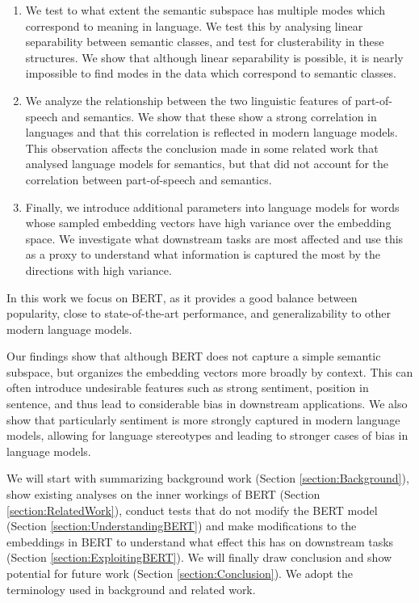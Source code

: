 \documentclass[a4paper,12pt,oneside,openright]{report}
\begin{document}
\begin{enumerate}
\item We test to what extent the semantic subspace has multiple modes which correspond to meaning in language.
We test this by analysing linear separability between semantic classes, and test for clusterability in these structures.
We show that although linear separability is possible, it is nearly impossible to find modes in the data which correspond to semantic classes.
\item We analyze the relationship between the two linguistic features of part-of-speech and semantics. 
We show that these show a strong correlation in languages and that this correlation is reflected in modern language models.
This observation affects the conclusion made in some related work that analysed language models for semantics, but that did not account for the correlation between part-of-speech and semantics.
\item Finally, we introduce additional parameters into language models for words whose sampled embedding vectors have high variance over the embedding space.
We investigate what downstream tasks are most affected and use this as a proxy to understand what information is captured the most by the directions with high variance.
\end{enumerate} 

In this work we focus on BERT, as it provides a good balance between popularity, close to state-of-the-art performance, and generalizability to other modern language models.

Our findings show that although BERT does not capture a simple semantic subspace, but organizes the embedding vectors more broadly by context.
This can often introduce undesirable features such as strong sentiment, position in sentence, and thus lead to considerable bias in downstream applications.
We also show that particularly sentiment is more strongly captured in modern language models, allowing for language stereotypes and leading to stronger cases of bias in language models.

We will start with summarizing background work (Section \ref{section:Background}), show existing analyses on the inner workings of BERT (Section \ref{section:RelatedWork}), conduct tests that do not modify the BERT model (Section \ref{section:UnderstandingBERT}) and make modifications to the embeddings in BERT to understand what effect this has on downstream tasks (Section \ref{section:ExploitingBERT}).
We will finally draw conclusion and show potential for future work (Section \ref{section:Conclusion}).
We adopt the terminology used in background and related work.
\end{document}
